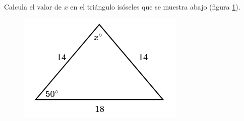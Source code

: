 Calcula el valor de $x$ en el triángulo isóseles  que se muestra abajo (figura \ref{fig:findangle01}).

\begin{minipage}[t][][t]{0.35\textwidth}
    \begin{figure}[H]
        \centering
        \includegraphics[width=0.9\linewidth]{../images/findangle01.png}
        \caption{}
        \label{fig:findangle01}
    \end{figure}
\end{minipage}\hfill
